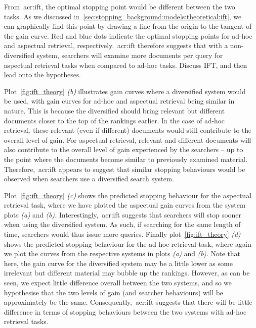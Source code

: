 From~\gls{acr:ift}, the optimal stopping point would be different between the two tasks. As we discussed in~\ref{sec:stopping_background:models:theoretical:ift}, we can graphically find this point by drawing a line from the origin to the tangent of the gain curve. Red and blue dots indicate the optimal stopping points for ad-hoc and aspectual retrieval, respectively.~\gls{acr:ift} therefore suggests that with a non-diversified system, searchers will examine more documents per query for aspectual retrieval tasks when compared to ad-hoc tasks.
Discuss IFT, and then lead onto the hypotheses.

Plot~\ref{fig:ift_theory} \emph{(b)} illustrates gain curves where a diversified system would be used, with gain curves for ad-hoc and aspectual retrieval being similar in nature. This is because the diversified should bring relevant but different documents closer to the top of the rankings earlier. In the case of ad-hoc retrieval, these relevant (even if different) documents would still contribute to the overall level of gain. For aspectual retrieval, relevant and different documents will also contribute to the overall level of gain experienced by the searchers -- up to the point where the documents become similar to previously examined material. Therefore,~\gls{acr:ift} appears to suggest that similar stopping behaviours would be observed when searchers use a diversified search system.

Plot~\ref{fig:ift_theory} \emph{(c)} shows the predicted stopping behaviour for the aspectual retrieval task, where we have plotted the aspectual gain curves from the system plots \emph{(a)} and \emph{(b).} Interestingly,~\gls{acr:ift} suggests that searchers will stop sooner when using the diversified system. As such, if searching for the same length of time, searchers would thus issue more queries. Finally plot~\ref{fig:ift_theory} \emph{(d)} shows the predicted stopping behaviour for the ad-hoc retrieval task, where again we plot the curves from the respective systems in plots \emph{(a)} and \emph{(b).} Note that here, the gain curve for the diversified system may be a little lower as some irrelevant but different material may bubble up the rankings. However, as can be seen, we expect little difference overall between the two systems, and so we hypothesise that the two levels of gain (and searcher behaviours) will be approximately be the same. Consequently,~\gls{acr:ift} suggests that there will be little difference in terms of stopping behaviours between the two systems with ad-hoc retrieval tasks.

